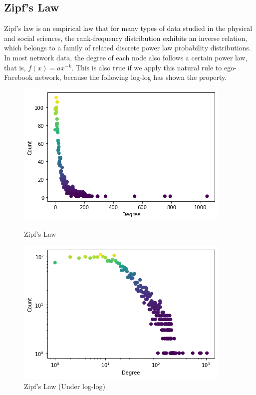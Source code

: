 \documentclass[11pt]{article}
\begin{document}
\subsection{Zipf's Law}
Zipf's law is an empirical law that for many types of data studied in the physical and social sciences, the rank-frequency distribution exhibits an inverse relation, which belongs to a family of related discrete power law probability distributions. In most network data, the degree of each node also follows a certain power law, that is, $f(x)=ax^{-k}$. This is also true if we apply this natural rule to ego-Facebook network, because the following log-log has shown the property.
\begin{figure}[H]
	\centering
	\parbox{.45\linewidth}{
		\centering
		\includegraphics[width=.5\linewidth]{graphs/zipf's law1.PNG}
		\caption{Zipf's Law}
	}
	\parbox{.45\linewidth}{
	\centering
	\includegraphics[width=.5\linewidth]{graphs/zipf's law.PNG}
	\caption{Zipf's Law (Under log-log)}
}
	\centering
\end{figure}
\end{document}
